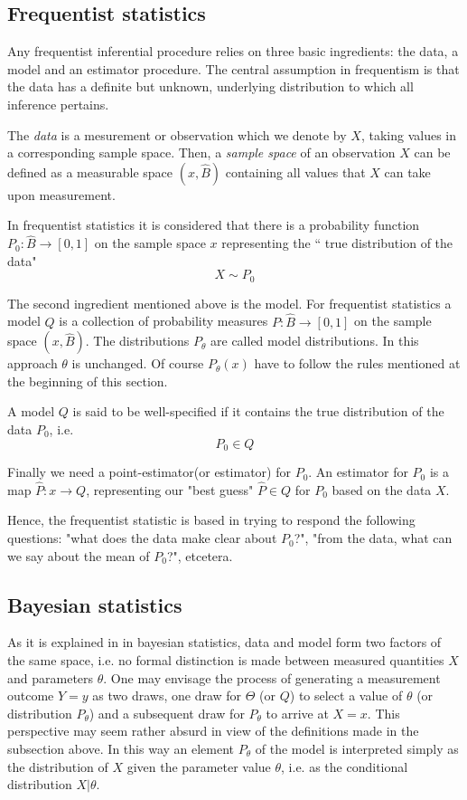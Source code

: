 \documentclass[onecolumn,           %
               showpacs,            %
               preprintnumbers,     %
               aps,                 %
               prl,          	    %
               letterpaper,             %
               superscriptaddress,      %
               nofootinbib,         %
               tightenlines,        %
               floats,floatfix      %
               ,usenatbib,
               ]{revtex4-1}
\begin{document}
\subsection{Frequentist statistics}

Any frequentist inferential procedure relies on three basic ingredients: the data, a model and an estimator procedure. The central assumption in frequentism is that the data has a definite but unknown, underlying distribution to which all inference pertains.

The \textit{data} is a mesurement or observation which we denote by $X$, taking values in a corresponding sample space. Then, a \textit{sample space} of an observation $X$ can be defined as a measurable space $(x,\hat B)$ containing all values that $X$ can take upon measurement.

In frequentist statistics it is considered that there is a probability function $P_0:\hat B\rightarrow [0,1]$ on the sample space $x$ representing the `` true distribution of the data"
\[X\sim P_0\]

The second ingredient mentioned above is the model. For frequentist statistics a model $Q$ is a collection of probability measures $P:\hat B\rightarrow[0,1]$ on the sample space $(x,\hat B)$. The distributions $P_\theta$ are called model distributions. In this approach $\theta$ is unchanged.  Of course $P_\theta(x)$ have to follow the rules mentioned at the beginning of this section.

A model $Q$ is said to be well-specified if it contains the true distribution of the data $P_0$, i.e.
\[P_0\in Q\]

Finally we need a point-estimator(or estimator) for $P_0$. An estimator for $P_0$ is a map $\hat P:x\rightarrow Q$, representing our "best guess" $\hat P\in Q$ for $P_0$ based on the data $X$.

Hence, the frequentist statistic is based in trying to respond the following questions: "what does the data make clear about $P_0$?", "from the data, what can we say about the mean of $P_0$?",  etcetera.

\subsection{Bayesian statistics}

As it is explained in \cite{bayeslecture} in bayesian statistics, data and model form two factors of the same space, i.e. no formal distinction is made between measured quantities $X$ and parameters $\theta$. One may envisage the process of generating a measurement outcome $Y=y$ as two draws, one draw for $\Theta$ (or $Q$)
to select a value of $\theta$ (or distribution $P_\theta$) and a subsequent draw for $P_\theta$ to arrive at $X=x$. This perspective may seem rather absurd in view of the definitions made in the subsection above. In this way an element $P_\theta$ of the model is interpreted simply as the distribution of $X$ given the parameter value $\theta$, i.e. as the conditional distribution $X|\theta$.
\end{document}

